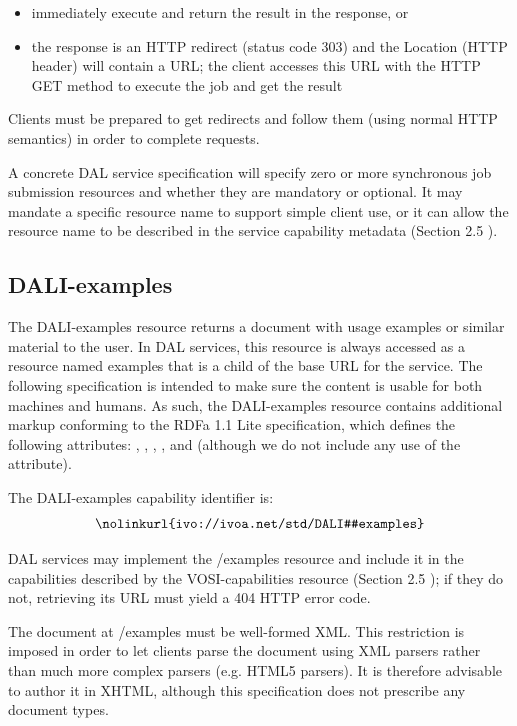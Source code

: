 \documentclass[11pt,letter]{ivoa}
\begin{document}
\begin{itemize}
\item immediately execute and return the result in the response, or 
\item the response is an HTTP redirect (status code 303) and the Location (HTTP 
header) will contain a URL; the client accesses this URL with the HTTP GET 
method to execute the job and get the result 
\end{itemize}

Clients must be prepared to get redirects and follow them (using normal HTTP 
semantics) in order to complete requests.

A concrete DAL service specification will specify zero or more synchronous job 
submission resources and whether they are mandatory or optional. It may mandate 
a specific resource name to support simple client use, or it can allow the 
resource name to be described in the service capability metadata (Section 2.5 ).

\subsection{DALI-examples}
\label{sec:dali-examples}
The DALI-examples resource returns a document with usage examples or similar 
material to the user. In DAL services, this resource is always accessed as a 
resource named examples that is a child of the base URL for the service. The 
following specification is intended to make sure the content is usable for both 
machines and humans. As such, the DALI-examples resource contains additional 
markup conforming to the RDFa 1.1 Lite \citep{std:RDFaLite11} specification, 
which defines the 
following attributes: , , ,
, and  (although we 
do not include any use of the  attribute).

The DALI-examples capability identifier is:
$$
\hbox{\nolinkurl{ivo://ivoa.net/std/DALI#examples}}
$$

DAL services may implement the /examples resource and include it in the 
capabilities described by the VOSI-capabilities resource (Section 2.5 ); if they 
do not, retrieving its URL must yield a 404 HTTP error code.

The document at /examples must be well-formed XML. This restriction is imposed 
in order to let clients parse the document using XML parsers rather than 
much more complex parsers (e.g. HTML5 parsers). It is therefore advisable to 
author it in XHTML, although this specification does not prescribe any document 
types.
\end{document}
